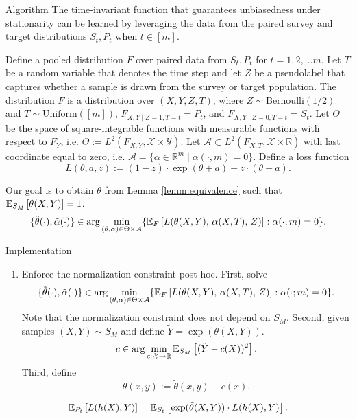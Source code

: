 \documentclass{article}
\theoremstyle{definition}
\theoremstyle{plain}
\theoremstyle{remark}
\begin{document}
\begin{section}{Algorithm}
The time-invariant function that guarantees unbiasedness under stationarity can be learned by leveraging the data from the paired survey and target distributions $S_{t}, P_{t}$ when $t \in [m]$. 

Define a pooled distribution $F$ over paired data from $S_{t}, P_{t}$ for $t=1, 2, \dots m$. Let $T$ be a random variable that denotes the time step and let $Z$ be a pseudolabel that captures whether a sample is drawn from the survey or target population. The distribution $F$ is a distribution over $(X, Y, Z, T)$, where $Z  \sim \text{Bernoulli}(1/2)$ and $T \sim \text{Uniform}([m])$, $F_{X, Y \mid Z=1, T=t} = P_{t}$, and  $F_{X, Y \mid Z= 0, T=t} = S_{t}$. Let $\Theta$ be the space of square-integrable functions with measurable functions with respect to $F_{Y}$, i.e. $\Theta := L^{2}(F_{X, Y}, \mathcal{X} \times \mathcal{Y}).$ Let $\mathcal{A} \subset L^{2}(F_{X, T}, \mathcal{X} \times \mathbb{R})$ with last coordinate equal to zero, i.e. $\mathcal{A} =  \{ \alpha \in \mathbb{R}^{m} \mid \alpha(\cdot, m) = 0\}.$ 
Define a loss function 
\begin{equation} L(\theta, a, z) := (1 - z) \cdot \exp(\theta + a) - z \cdot (\theta + a).\end{equation}

Our goal is to obtain $\theta$ from Lemma \ref{lemm:equivalence} such that $\EE[S_{M}]{\theta(X, Y)} = 1$.
\begin{equation} 
\label{eq:loss_min}
\{\tilde{\theta}(\cdot), \tilde{\alpha}(\cdot)\} \in \arg\min_{(\theta, \alpha) \in \Theta \times \mathcal{A}} \{\EE[F]{L(\theta(X, Y),\, \alpha(X, T),\, Z)}: \alpha(\cdot, m) = 0\}.\end{equation}

Implementation
\begin{enumerate}
  \item Enforce the normalization constraint post-hoc. First, solve
  \[\{\tilde{\theta}(\cdot), \tilde{\alpha}(\cdot)\} \in \arg\min_{(\theta, \alpha) \in \Theta \times \mathcal{A}} \{\EE[F]{L(\theta(X, Y),\, \alpha(X, T),\, Z)}: \alpha(\cdot; m) = 0\}.\]
  Note that the normalization constraint does not depend on $S_{M}$. Second, given samples $(X, Y) \sim S_{M}$ and define $\tilde{Y} = \exp(\theta(X, Y)).$
  \[  c \in \arg\min_{c: \mathcal{X} \rightarrow \mathbb{R}}\EE[S_{M}]{(\tilde{Y} - c(X))^{2}}.\]
  Third, define
  \[ \theta(x, y) := \tilde{\theta}(x, y) - c(x).\]
\end{enumerate}

\begin{equation} 
\EE[P_{t}]{L(h(X), Y)} = \EE[S_{t}]{\exp(\tilde{\theta}(X, Y)) \cdot L(h(X), Y)}.
\end{equation}
\end{section}
\end{document}
